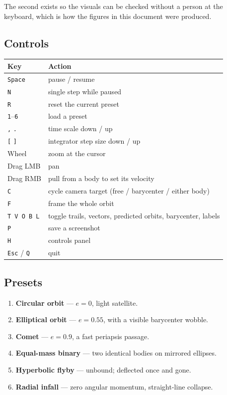 \documentclass[11pt,a4paper]{article}
\begin{document}
\noindent
The second exists so the visuals can be checked without a person at the
keyboard, which is how the figures in this document were produced.

\subsection{Controls}

\begin{center}
\begin{tabular}{@{}ll@{}}
\toprule
\textbf{Key} & \textbf{Action}\\
\midrule
\texttt{Space}      & pause / resume\\
\texttt{N}          & single step while paused\\
\texttt{R}          & reset the current preset\\
\texttt{1}--\texttt{6} & load a preset\\
\texttt{,} \texttt{.}  & time scale down / up\\
\texttt{[} \texttt{]}  & integrator step size down / up\\
Wheel               & zoom at the cursor\\
Drag LMB            & pan\\
Drag RMB            & pull from a body to set its velocity\\
\texttt{C}          & cycle camera target (free / barycenter / either body)\\
\texttt{F}          & frame the whole orbit\\
\texttt{T V O B L}  & toggle trails, vectors, predicted orbits, barycenter, labels\\
\texttt{P}          & save a screenshot\\
\texttt{H}          & controls panel\\
\texttt{Esc} / \texttt{Q} & quit\\
\bottomrule
\end{tabular}
\end{center}

\subsection{Presets}

\begin{enumerate}\itemsep2pt
  \item \textbf{Circular orbit} --- $e = 0$, light satellite.
  \item \textbf{Elliptical orbit} --- $e = 0.55$, with a visible barycenter wobble.
  \item \textbf{Comet} --- $e = 0.9$, a fast periapsis passage.
  \item \textbf{Equal-mass binary} --- two identical bodies on mirrored ellipses.
  \item \textbf{Hyperbolic flyby} --- unbound; deflected once and gone.
  \item \textbf{Radial infall} --- zero angular momentum, straight-line collapse.
\end{enumerate}
\end{document}
